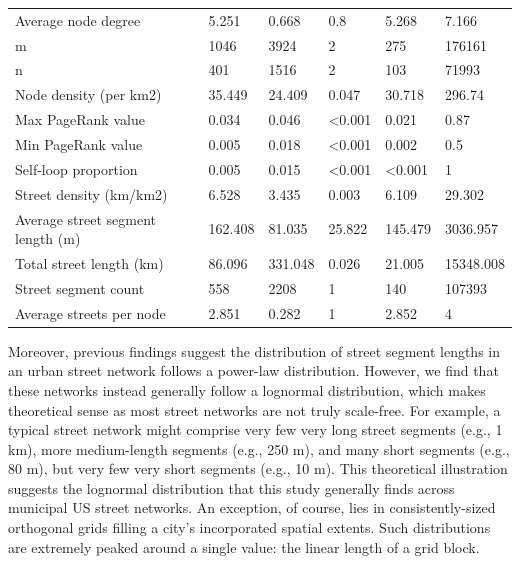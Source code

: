 \documentclass{article}
\begin{document}
\begin{table}
\begin{tabular}{llllll}
	Average node degree                         & 5.251   & 0.668   & 0.8            & 5.268          & 7.166     \\
	m                                           & 1046    & 3924    & 2              & 275            & 176161    \\
	n                                           & 401     & 1516    & 2              & 103            & 71993     \\
	Node density (per km2)                      & 35.449  & 24.409  & 0.047          & 30.718         & 296.74    \\
	Max PageRank value                          & 0.034   & 0.046   & \textless0.001 & 0.021          & 0.87      \\
	Min PageRank value                          & 0.005   & 0.018   & \textless0.001 & 0.002          & 0.5       \\
	Self-loop proportion                        & 0.005   & 0.015   & \textless0.001 & \textless0.001 & 1         \\
	Street density (km/km2)                     & 6.528   & 3.435   & 0.003          & 6.109          & 29.302    \\
	Average street segment length (m)           & 162.408 & 81.035  & 25.822         & 145.479        & 3036.957  \\
	Total street length (km)                    & 86.096  & 331.048 & 0.026          & 21.005         & 15348.008 \\
	Street segment count                        & 558     & 2208    & 1              & 140            & 107393    \\
	Average streets per node                    & 2.851   & 0.282   & 1              & 2.852          & 4         \\
	\bottomrule
\end{tabular}
\end{table}

Moreover, previous findings \citep[e.g.,][]{masucci_random_2009} suggest the distribution of street segment lengths in an urban street network follows a power-law distribution. However, we find that these networks instead generally follow a lognormal distribution, which makes theoretical sense as most street networks are not truly scale-free. For example, a typical street network might comprise very few very long street segments (e.g., 1 km), more medium-length segments (e.g., 250 m), and many short segments (e.g., 80 m), but very few very short segments (e.g., 10 m). This theoretical illustration suggests the lognormal distribution that this study generally finds across municipal US street networks. An exception, of course, lies in consistently-sized orthogonal grids filling a city's incorporated spatial extents. Such distributions are extremely peaked around a single value: the linear length of a grid block.
\end{document}
